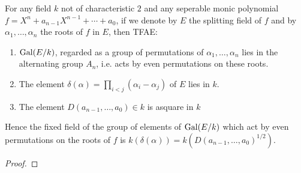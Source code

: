 \begin{example}
\begin{bergman}
\begin{lemma}
      For any field $k$ not of characteristic $2$ and any seperable monic polynomial $f = X^n + a_{n-1}X^{n-1}+\cdots + a_0$, if we denote by $E$ the splitting field of $f$ and by $\alpha_1,\ldots,\alpha_n$ the roots of $f$ in $E$, then TFAE:\begin{enumerate}[label = (\alph*)]
        \item $\text{Gal}(E/k)$, regarded as a group of permutations of $\alpha_1,\ldots,\alpha_n$ lies in the alternating group $A_n$, i.e. acts by even permutations on these roots.
        \item The element $\delta(\alpha) = \prod_{i<j}(\alpha_i-\alpha_j)$ of $E$ lies in $k$.
        \item The element $D(a_{n-1},\ldots,a_0)\in k$ is  asquare in $k$
      \end{enumerate}
      Hence the fixed field of the group of elements of $\text{Gal}(E/k)$ which act by even permutations on the roots of $f$ is $k(\delta(\alpha)) = k({D(a_{n-1},\ldots,a_0)}^{1/2})$.
    \end{lemma}
    \begin{proof}
      
    \end{proof}
	\end{bergman}
  \end{example}
\printindex


